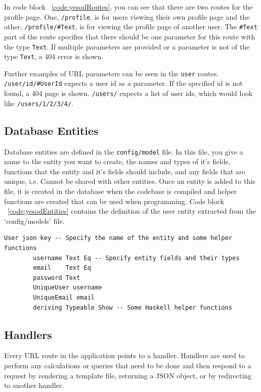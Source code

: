 In code block ~\ref{code:yesodRoutes}, you can see that there
are two routes for the profile page. One, \texttt{/profile}, is for users
viewing their own profile page and the other, \texttt{/profile/\#Text}, is
for viewing the profile page of another user. The \texttt{\#Text} part
of the route specifies that there should be one parameter for this
route with the type \texttt{Text}. If multiple parameters are provided or a parameter
is not of the type \texttt{Text}, a 404 error is shown.

Further examples of URL parameters can be seen in the \texttt{user} routes. 
\texttt{/user/id/\#UserId} expects a user id as a parameter. If the specified
id is not found, a 404 page is shown. \texttt{/users/\*[UserId]} expects a list
of user ids, which would look like \texttt{/users/1/2/3/4/}.

\subsection{Database Entities}

Database entities are defined in the \texttt{config/model} file. In this file, you
give a name to the entity you want to create, the names and types of it's
fields, functions that the entity and it's fields should include, and
any fields that are unique, i.e. Cannot be shared with other entities.
Once an entity is added to this file, it is created in the database
when the codebase is compiled and helper functions are created that
can be used when programming. Code block ~\ref{code:yesodEntities} contains
the definition of the user entity extracted from the `config/models' file.

\begin{lstlisting}[caption={Yesod Database Entities},label={code:yesodEntities}]
	User json key -- Specify the name of the entity and some helper functions
		username Text Eq -- Specify entity fields and their types
		email    Text Eq
		password Text
		UniqueUser username
		UniqueEmail email
		deriving Typeable Show -- Some Haskell helper functions
\end{lstlisting}

\subsection{Handlers}

Every URL route in the application points to a handler.
Handlers are used to perform any calculations or queries 
that need to be done and then respond to a request by rendering a template file, 
returning a JSON object, or by redirecting to another handler.

